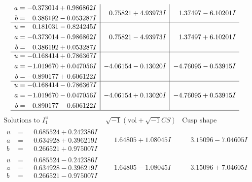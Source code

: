 \documentclass[1p]{elsarticle_modified}
\theoremstyle{definition}
\newcommand{\I}{\sqrt{-1}}
\begin{document}
$$\begin{array}{c|c|c}
\begin{aligned}
a &= -0.373014 + 0.986862 I \\
b &= \phantom{-}0.386192 - 0.053287 I\end{aligned}
 & \phantom{-}0.75821 + 4.93973 I & \phantom{-}1.37497 - 6.10201 I \\ \hline\begin{aligned}
u &= \phantom{-}0.181031 - 0.824245 I \\
a &= -0.373014 - 0.986862 I \\
b &= \phantom{-}0.386192 + 0.053287 I\end{aligned}
 & \phantom{-}0.75821 - 4.93973 I & \phantom{-}1.37497 + 6.10201 I \\ \hline\begin{aligned}
u &= -0.168414 + 0.786367 I \\
a &= -1.019670 + 0.047056 I \\
b &= -0.890177 + 0.606122 I\end{aligned}
 & -4.06154 - 0.13020 I & -4.76095 - 0.53915 I \\ \hline\begin{aligned}
u &= -0.168414 - 0.786367 I \\
a &= -1.019670 - 0.047056 I \\
b &= -0.890177 - 0.606122 I\end{aligned}
 & -4.06154 + 0.13020 I & -4.76095 + 0.53915 I\\
 \hline 
 \end{array}$$\newpage$$\begin{array}{c|c|c}  
\text{Solutions to }I^u_{1}& \I (\text{vol} + \sqrt{-1}CS) & \text{Cusp shape}\\
 \hline 
\begin{aligned}
u &= \phantom{-}0.685524 + 0.242386 I \\
a &= \phantom{-}0.634928 + 0.396219 I \\
b &= \phantom{-}0.266521 + 0.975007 I\end{aligned}
 & \phantom{-}1.64805 + 1.08045 I & \phantom{-}3.15096 - 7.04605 I \\ \hline\begin{aligned}
u &= \phantom{-}0.685524 - 0.242386 I \\
a &= \phantom{-}0.634928 - 0.396219 I \\
b &= \phantom{-}0.266521 - 0.975007 I\end{aligned}
 & \phantom{-}1.64805 - 1.08045 I & \phantom{-}3.15096 + 7.04605 I \\ \hline\begin{aligned}

\end{aligned}
\end{array}$$
\end{document}
